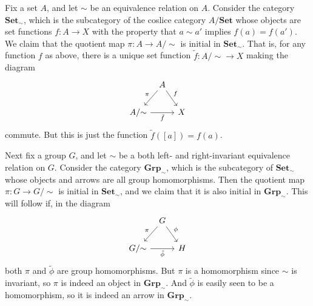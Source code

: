 \documentclass[article, a4paper, 11pt, oneside]{memoir}
\numberwithin{equation}{chapter}
\newcommand{\ncat}[1]{\mathbf{#1}} %
\newcommand{\catSet}{\ncat{Set}} %
\newcommand{\catGrp}{\ncat{Grp}} %
\theoremstyle{nonumberplain}
\begin{document}
\begin{remarkbreak}
    Fix a set $A$, and let $\sim$ be an equivalence relation on $A$. Consider the category $\catSet_{\sim}$, which is the subcategory of the coslice category $A/\catSet$ whose objects are set functions $f \colon A \to X$ with the property that $a \sim a'$ implies $f(a) = f(a')$. We claim that the quotient map $\pi \colon A \to A/{\sim}$ is initial in $\catSet_{\sim}$. That is, for any function $f$ as above, there is a unique set function $\tilde{f} \colon A/{\sim} \to X$ making the diagram
    \begin{equation*}
        \begin{tikzcd}[column sep=tiny]
            & A
                \ar[dl, "\pi", swap]
                \ar[dr, "f"] \\
            A/{\sim}
                \ar[rr, "\tilde{f}", swap]
            && X
        \end{tikzcd}
    \end{equation*}
    commute. But this is just the function $\tilde{f}([a]) = f(a)$.

    Next fix a group $G$, and let $\sim$ be a both left- and right-invariant equivalence relation on $G$. Consider the category $\catGrp_{\sim}$, which is the subcategory of $\catSet_{\sim}$ whose objects and arrows are all group homomorphisms. Then the quotient map $\pi \colon G \to G/{\sim}$ is initial in $\catSet_{\sim}$, and we claim that it is also initial in $\catGrp_{\sim}$. This will follow if, in the diagram
    \begin{equation*}
        \begin{tikzcd}[column sep=tiny]
            & G
                \ar[dl, "\pi", swap]
                \ar[dr, "\phi"] \\
            G/{\sim}
                \ar[rr, "\tilde{\phi}", swap]
            && H
        \end{tikzcd}
    \end{equation*}
    both $\pi$ and $\tilde{\phi}$ are group homomorphisms. But $\pi$ is a homomorphism since $\sim$ is invariant, so $\pi$ is indeed an object in $\catGrp_{\sim}$. And $\tilde{\phi}$ is easily seen to be a homomorphism, so it is indeed an arrow in $\catGrp_{\sim}$.


\end{remarkbreak}
\end{document}
